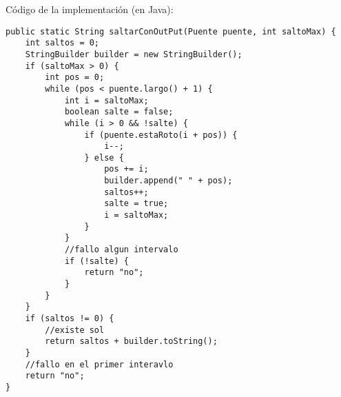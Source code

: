 Código de la implementaci\'on (en Java):
\begin{lstlisting}[frame=single]
public static String saltarConOutPut(Puente puente, int saltoMax) {
    int saltos = 0;
    StringBuilder builder = new StringBuilder();
    if (saltoMax > 0) {
        int pos = 0;
        while (pos < puente.largo() + 1) {
            int i = saltoMax;
            boolean salte = false;
            while (i > 0 && !salte) {
                if (puente.estaRoto(i + pos)) {
                    i--;
                } else {
                    pos += i;
                    builder.append(" " + pos);
                    saltos++;
                    salte = true;
                    i = saltoMax;
                }
            }
            //fallo algun intervalo
            if (!salte) {
                return "no";
            }
        }
    }
    if (saltos != 0) {
        //existe sol        
        return saltos + builder.toString();
    }
    //fallo en el primer interavlo
    return "no";
}
\end{lstlisting}

